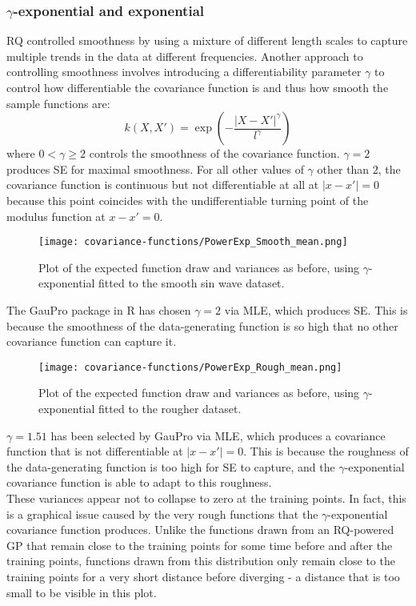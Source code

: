 \subsubsection{$\gamma$-exponential and exponential}
RQ controlled smoothness by using a mixture of different length scales to capture multiple trends in the data at different frequencies. Another approach to controlling smoothness involves introducing a differentiability parameter $\gamma$ to control how differentiable the covariance function is and thus how smooth the sample functions are:
\begin{equation*}
    k(X,X') = \exp \left(-\frac{|X - X'|^{\gamma}}{l^{\gamma}} \right)
\end{equation*}
where $0 < \gamma \geq 2$ controls the smoothness of the covariance function. 
$\gamma = 2$ produces SE for maximal smoothness. For all other values of $\gamma$ other than $2$, the covariance function is continuous but not differentiable at all at $|x - x'| = 0$ because this point coincides with the undifferentiable turning point of the modulus function at $x - x' = 0$.

\begin{figure}[H]
    \texttt{[image: covariance-functions/PowerExp\_Smooth\_mean.png]}
    \caption{
        Plot of the expected function draw and variances as before, using $\gamma$-exponential fitted to the smooth sin wave dataset. \\ 
    }
\end{figure}
The GauPro package \cite{gaupro} in R has chosen $\gamma = 2$ via MLE, which produces SE. This is because the smoothness of the data-generating function is so high that no other covariance function can capture it.

\begin{figure}[H]
    \texttt{[image: covariance-functions/PowerExp\_Rough\_mean.png]}
    \caption{
        Plot of the expected function draw and variances as before, using $\gamma$-exponential fitted to the rougher dataset. \\
    }
\end{figure}
$\gamma = 1.51$ has been selected by GauPro \cite{gaupro} via MLE, which produces a covariance function that is not differentiable at $|x - x'| = 0$. This is because the roughness of the data-generating function is too high for SE to capture, and the $\gamma$-exponential covariance function is able to adapt to this roughness. \\
        These variances appear not to collapse to zero at the training points. In fact, this is a graphical issue caused by the very rough functions that the $\gamma$-exponential covariance function produces. Unlike the functions drawn from an RQ-powered GP that remain close to the training points for some time before and after the training points, functions drawn from this distribution only remain close to the training points for a very short distance before diverging - a distance that is too small to be visible in this plot.

